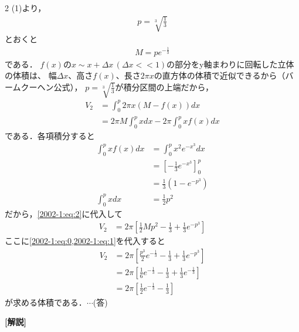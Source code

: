 \documentclass[../../../../main.tex]{subfiles}
\begin{document}
\begin{multicols}{2}
    (1)より，
    \begin{align}
        p=\sqrt[3]{\frac{1}{3}}  \label{2002-1:eq:0}
    \end{align}
    とおくと
    \begin{align}
        M = p e^{-\frac{1}{3}} \label{2002-1:eq:1}
    \end{align}
    である．
    $f(x)$の$x \sim x+\Delta x \, (\Delta x << 1)$の部分をy軸まわりに回転した立体の体積は、
    幅$\Delta x$、高さ$f(x)$、長さ$2\pi x$の直方体の体積で近似できるから（バームクーヘン公式），
    $p=\sqrt[3]{\frac{1}{3}}$が積分区間の上端だから，
    \begin{align}
        V_2
         & = \int_0^p 2\pi x(M-f(x))dx                                        \\
         & = 2\pi M\int_0^p x dx - 2\pi \int_0^p xf(x) dx \label{2002-1:eq:2}
    \end{align}
    である．各項積分すると
    \begin{align*}
        \int_0^p xf(x)dx
                     & = \int_0^p x^2 e^{-x^3} dx              \\
                     & = \left[-\frac{1}{3}e^{-x^3}\right]_0^p \\
                     & = \frac{1}{3}\left(1-e^{-p^3}\right)    \\
        \int_0^p xdx & = \frac{1}{2}p^2
    \end{align*}
    だから，\cref{2002-1:eq:2}に代入して
    \begin{align*}
        V_2
         & = 2\pi \left[\frac{1}{2}Mp^2 - \frac{1}{3} + \frac{1}{3}e^{-p^3}\right]
    \end{align*}
    ここに\cref{2002-1:eq:0,2002-1:eq:1}を代入すると
    \begin{align*}
        V_2
         & = 2\pi \left[\frac{p^3}{2} e^{-\frac{1}{3}} - \frac{1}{3} + \frac{1}{3}e^{-p^3}\right]        \\
         & = 2\pi \left[\frac{1}{6} e^{-\frac{1}{3}}  - \frac{1}{3} + \frac{1}{3}e^{-\frac{1}{3}}\right] \\
         & = 2\pi \left[\frac{1}{2} e^{-\frac{1}{3}}  - \frac{1}{3} \right]
    \end{align*}
    が求める体積である．$\cdots$(答)

    {\bf[解説]}

    \newpage
\end{multicols}
\end{document}
